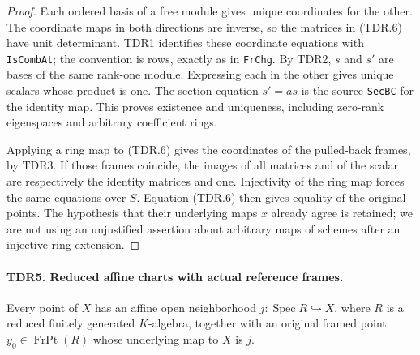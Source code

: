 \documentclass[11pt,a4paper]{article}
\numberwithin{equation}{section}
\theoremstyle{remark}\newtheorem{remark}[theorem]{Remark}
\begin{document}
\begin{proof}
Each ordered basis of a free module gives unique coordinates for
the other.  The coordinate maps in both directions are inverse,
so the matrices in (TDR.6) have unit determinant.  TDR1 identifies
these coordinate equations with \texttt{Is\allowbreak Comb\allowbreak At}; the convention
is rows, exactly as in \texttt{Fr\allowbreak Chg}.  By TDR2, \(s\) and \(s'\)
are bases of the same rank-one module.  Expressing each in the other
gives unique scalars whose product is one.  The section equation
\(s'=a s\) is the source \texttt{Sec\allowbreak BC} for the identity map.
This proves existence and uniqueness, including zero-rank
eigenspaces and arbitrary coefficient rings.

Applying a ring map to (TDR.6) gives the coordinates of the
pulled-back frames, by TDR3.  If those frames coincide, the images
of all matrices and of the scalar are respectively the identity
matrices and one.  Injectivity of the ring map forces the same
equations over \(S\).  Equation (TDR.6) then gives equality of
the original points.  The hypothesis that their underlying maps
\(x\) already agree is retained; we are not using an unjustified
assertion about arbitrary maps of schemes after an injective ring
extension.
\end{proof}

\paragraph{TDR5. Reduced affine charts with actual reference frames.}
\label{claim:TDR5}
Every point of \(X\) has an affine open neighborhood
\(j:\operatorname{Spec}R\hookrightarrow X\), where \(R\) is
a reduced finitely generated \(K\)-algebra, together with an
original framed point \(y_0\in\operatorname{FrPt}(R)\) whose
underlying map to \(X\) is \(j\).
\end{document}
